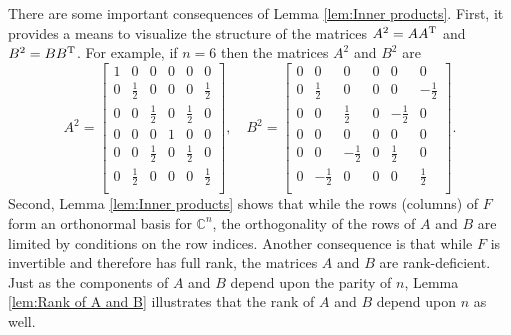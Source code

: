 There are some important consequences of Lemma \ref{lem:Inner products}. First, it provides a means to visualize the structure of the matrices $A^2 = AA^{\mathrm{T}}$ and $B^2 = BB^{\mathrm{T}}$. For example, if $n = 6$ then the matrices $A^2$ and $B^2$ are
\[A^2 = \begin{bmatrix}
1 & 0 & 0 & 0 & 0 & 0 \\
0 & \frac{1}{2} & 0 & 0 & 0 & \frac{1}{2} \\
0 & 0 & \frac{1}{2} & 0 & \frac{1}{2} & 0 \\
0 & 0 & 0 & 1 & 0 & 0 \\
0 & 0 & \frac{1}{2} & 0 & \frac{1}{2} & 0 \\
0 & \frac{1}{2} & 0 & 0 & 0 & \frac{1}{2} \\
\end{bmatrix}, \quad B^2 = \begin{bmatrix}
0 & 0 & 0 & 0 & 0 & 0 \\
0 & \frac{1}{2} & 0 & 0 & 0 & -\frac{1}{2} \\
0 & 0 & \frac{1}{2} & 0 & -\frac{1}{2} & 0 \\
0 & 0 & 0 & 0 & 0 & 0 \\
0 & 0 & -\frac{1}{2} & 0 & \frac{1}{2} & 0 \\
0 & -\frac{1}{2} & 0 & 0 & 0 & \frac{1}{2} \\
\end{bmatrix}.\]
Second, Lemma \ref{lem:Inner products} shows that while the rows (columns) of $F$ form an orthonormal basis for $\mathbb{C}^n$, the orthogonality of the rows of $A$ and $B$ are limited by conditions on the row indices. Another consequence is that while $F$ is invertible and therefore has full rank, the matrices $A$ and $B$ are rank-deficient. Just as the components of $A$ and $B$ depend upon the parity of $n$, Lemma \ref{lem:Rank of A and B} illustrates that the rank of $A$ and $B$ depend upon $n$ as well.

